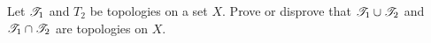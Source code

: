 Let $\mathscr{T}_1$ and $T_2$ be topologies on a set $X$. Prove or disprove that $\mathscr{T}_1 \cup \mathscr{T}_2$ and $\mathscr{T}_1 \cap \mathscr{T}_2$ are topologies on $X$.

\begin{solution}$ $
	
\end{solution}